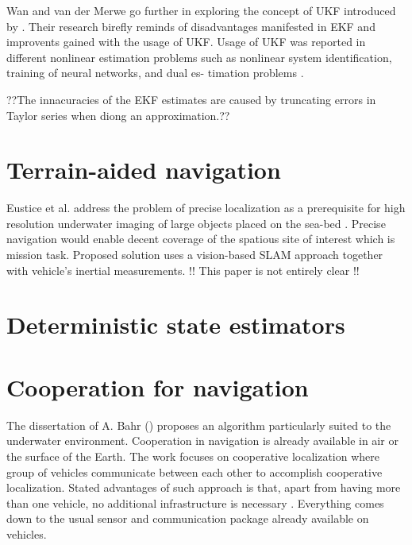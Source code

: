 Wan and van der Merwe \cite{} go further in exploring the concept of UKF introduced by \cite{julier96}. Their research birefly reminds of disadvantages manifested in EKF and improvents gained with the usage of UKF. Usage of UKF was reported in different nonlinear estimation problems such as nonlinear system identification, training of neural networks, and dual es- 
timation problems 
. 


 
??The innacuracies of the EKF estimates are caused by truncating errors in Taylor series when diong an approximation.??

\section{Terrain-aided navigation} \label{sec:terrain-aided}

Eustice et al. address the problem of precise localization as a prerequisite for high resolution underwater imaging of large objects placed on the sea-bed \cite{eustice05}. Precise navigation would enable decent coverage of the spatious site of interest which is mission task. Proposed solution uses a vision-based SLAM approach together with vehicle's inertial measurements. !! This paper is not entirely clear !!

\section{Deterministic state estimators}
 
\section{Cooperation for navigation}
The dissertation of A. Bahr (\cite{bahr08}) proposes an algorithm particularly suited to the underwater environment. Cooperation in navigation is already available in air or the surface of the Earth. The work focuses on cooperative localization where group of vehicles communicate between each other to accomplish cooperative localization. Stated advantages of such approach is that, apart from having more than one vehicle, no additional infrastructure is necessary \cite{bahr08}. Everything comes down to the usual sensor and communication package already available on vehicles\cite{bahr08}. 

  